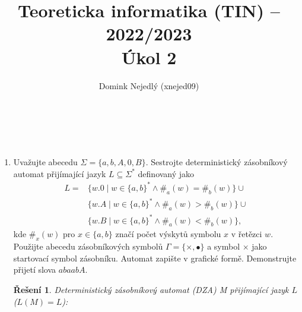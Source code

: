 \documentclass[11pt, a4paper]{article}
\title{Teoreticka informatika (TIN) – 2022/2023\\ Úkol 2}
\author{Domink Nejedlý (xnejed09) }
\makeatletter
\theoremstyle{result}
\newtheorem*{result}{Řešení}
\renewcommand\maketitle{
{\raggedright %
\begin{center}
{\Large \bfseries \@title }\\[2ex]
{\@author}\\[8ex] 
\end{center}}} %
\makeatother
\begin{document}
\maketitle





\begin{enumerate}





    \item
    Uvažujte abecedu $\Sigma = \{a, b, A, 0, B\}$. Sestrojte deterministický zásobníkový automat přijímající jazyk $L \subseteq \Sigma^*$ definovaný jako
    \begin{align*}
        L = &\{w.0 \mid w \in \{a, b\}^* \land \#_a(w) = \#_b(w)\} \cup \\
            &\{w.A \mid w \in \{a, b\}^* \land \#_a(w) > \#_b(w)\} \cup \\
            &\{w.B \mid w \in \{a, b\}^* \land \#_a(w) < \#_b(w)\},
    \end{align*}
    kde $\#_x(w)$ pro $x \in \{a, b\}$ značí počet výskytů symbolu $x$ v řetězci $w$. Použijte abecedu zásobníkových symbolů $\Gamma = \{\times, \bullet\}$ a symbol $\times$ jako startovací symbol zásobníku. Automat zapište v grafické formě. Demonstrujte přijetí slova $abaabA$.
    
    
    \begin{result}
        Deterministický zásobníkový automat (DZA) M přijímající jazyk $L$ ($L(M) = L$):
        \begin{figure}[h]
        \centering
\end{figure}
\end{result}
\end{enumerate}
\end{document}
